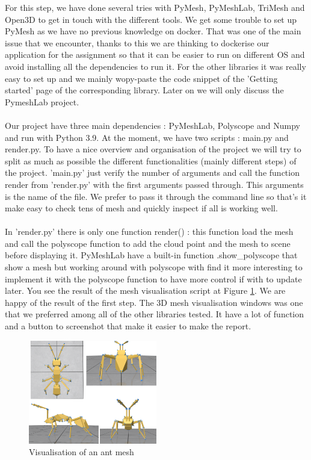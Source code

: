 \documentclass[10pt,twocolumn,letterpaper]{article}
\begin{document}
	For this step, we have done several tries with PyMesh, PyMeshLab, TriMesh and Open3D to get in touch with the different tools. We get some trouble to set up PyMesh as we have no previous knowledge on docker. That was one of the main issue that we encounter, thanks to this we are thinking to dockerise our application for the assignment so that it can be easier to run on different OS and avoid installing all the dependencies to run it. For the other libraries it was really easy to set up and we mainly wopy-paste the code snippet of the 'Getting started' page of the corresponding library.  Later on  we will only discuss the PymeshLab project. \\ \\
	Our project have three main dependencies : PyMeshLab, Polyscope and Numpy and run with Python 3.9. At the moment, we have two scripts : main.py and render.py. To have a nice overview and organisation of  the project we will try to split as much as possible the different functionalities (mainly different steps) of the project. 'main.py' just verify the number of arguments and call the function render from 'render.py' with the first arguments passed through. This arguments is the name of the file. We prefer to pass it through the command line so that's it make easy to check tens of mesh and quickly inspect if all is working well. \\ \\
	In 'render.py' there is only one function render() : this function load the mesh and call the polyscope function to add the cloud point and the mesh to scene before displaying it. PyMeshLab have a built-in function .show\_polyscope that show a mesh but working around with polyscope with find it more interesting to implement it with the polyscope function to have more control if with to update later. You see the result of the mesh visualisation script at Figure \ref{fig:ant-mesh}. We are happy of the result of the first step. The 3D mesh visualisation windows was one that we preferred among all of the other libraries tested. It have a lot of function and a button to screenshot that make it easier to make the report.


\begin{figure}
\begin{center}
  \includegraphics[width=0.5\textwidth]{ant}
  \caption{Visualisation of an ant mesh}
  \label{fig:ant-mesh}
  \end{center}
\end{figure}


\medskip

\printbibliography
\end{document}
